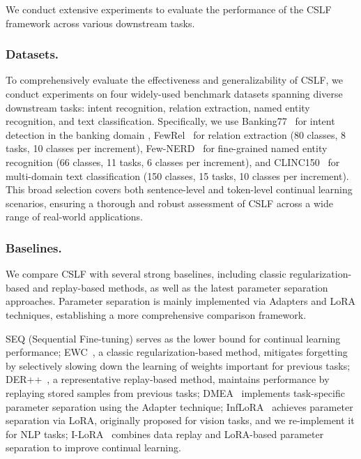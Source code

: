 \documentclass[11pt]{article}
\begin{document}
We conduct extensive experiments to evaluate the performance of the CSLF framework across various downstream tasks. 

\subsubsection{Datasets.} To comprehensively evaluate the effectiveness and generalizability of CSLF, we conduct experiments on four widely-used benchmark datasets spanning diverse downstream tasks: intent recognition, relation extraction, named entity recognition, and text classification. Specifically, we use Banking77~\cite{casanueva2020efficient} for intent detection in the banking domain , FewRel~\cite{han2018fewrel} for relation extraction (80 classes, 8 tasks, 10 classes per increment), Few-NERD~\cite{ding2021few} for fine-grained named entity recognition (66 classes, 11 tasks, 6 classes per increment), and CLINC150~\cite{ethayarajh2019contextual} for multi-domain text classification (150 classes, 15 tasks, 10 classes per increment). This broad selection covers both sentence-level and token-level continual learning scenarios, ensuring a thorough and robust assessment of CSLF across a wide range of real-world applications.

\subsubsection{Baselines.} We compare CSLF with several strong baselines, including classic regularization-based and replay-based methods, as well as the latest parameter separation approaches. Parameter separation is mainly implemented via Adapters and LoRA techniques, establishing a more comprehensive comparison framework.

SEQ (Sequential Fine-tuning) serves as the lower bound for continual learning performance; EWC~\cite{ewc_2017}, a classic regularization-based method, mitigates forgetting by selectively slowing down the learning of weights important for previous tasks; DER++~\cite{derpp}, a representative replay-based method, maintains performance by replaying stored samples from previous tasks; DMEA~\cite{dmea} implements task-specific parameter separation using the Adapter technique; InfLoRA~\cite{inf_lora} achieves parameter separation via LoRA, originally proposed for vision tasks, and we re-implement it for NLP tasks; I-LoRA~\cite{i_lora} combines data replay and LoRA-based parameter separation to improve continual learning.
\end{document}
